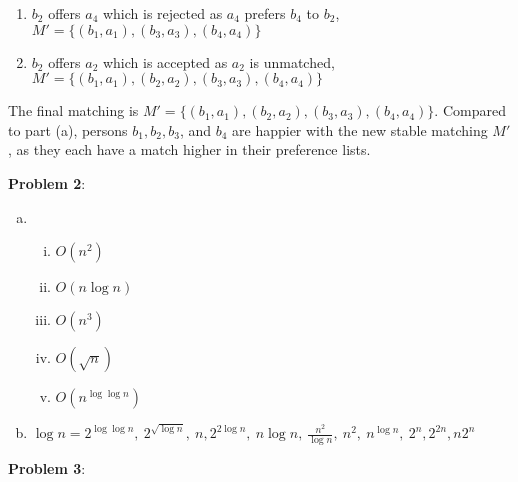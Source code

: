 \documentclass{article}
\begin{document}
\begin{enumerate}[a)]
\begin{enumerate}[1.]
        \item $b_2$ offers $a_4$ which is rejected as $a_4$ prefers $b_4$ to $b_2$, $M' = \{(b_1, a_1), (b_3, a_3), (b_4, a_4)\}$
        \item $b_2$ offers $a_2$ which is accepted as $a_2$ is unmatched, $M' = \{(b_1, a_1), (b_2, a_2), (b_3, a_3), (b_4, a_4)\}$
    \end{enumerate}
    The final matching is $M' = \{(b_1, a_1), (b_2, a_2), (b_3, a_3), (b_4, a_4)\}$. Compared to part (a), persons $b_1, b_2, b_3$, and $b_4$ are happier with the new stable matching $M'$, as they each have a match higher in their preference lists. 
\end{enumerate}
\textbf{Problem 2}:
\begin{enumerate}[a)]
    \item 
    \begin{enumerate}[(i)]
        \item $O(n^2)$
        \item $O(n \log n)$
        \item $O(n^3)$
        \item $O(\sqrt{n})$
        \item $O(n^{\log \log n})$
    \end{enumerate}
    \item $\log n = 2^{\log \log n},\ 2^{\sqrt{\log n}},\ n, 2^{2 \log n}, \ n \log n,\ \frac{n^2}{\log n},\ n^2,\ n^{\log n},\ 2^n, 2^{2n}, n2^n$
\end{enumerate}
\textbf{Problem 3}:
\end{document}
